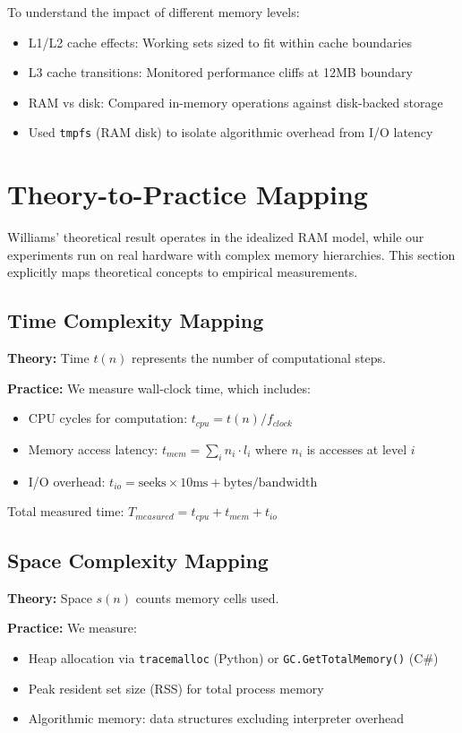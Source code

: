 \documentclass[11pt]{article}
\theoremstyle{definition}
\begin{document}
To understand the impact of different memory levels:
\begin{itemize}
\item L1/L2 cache effects: Working sets sized to fit within cache boundaries
\item L3 cache transitions: Monitored performance cliffs at 12MB boundary
\item RAM vs disk: Compared in-memory operations against disk-backed storage
\item Used \texttt{tmpfs} (RAM disk) to isolate algorithmic overhead from I/O latency
\end{itemize}

\section{Theory-to-Practice Mapping}
\label{sec:theory-practice}

Williams' theoretical result operates in the idealized RAM model, while our experiments run on real hardware with complex memory hierarchies. This section explicitly maps theoretical concepts to empirical measurements.

\subsection{Time Complexity Mapping}

\textbf{Theory:} Time $t(n)$ represents the number of computational steps.

\textbf{Practice:} We measure wall-clock time, which includes:
\begin{itemize}
\item CPU cycles for computation: $t_{cpu} = t(n) / f_{clock}$
\item Memory access latency: $t_{mem} = \sum_{i} n_i \cdot l_i$ where $n_i$ is accesses at level $i$
\item I/O overhead: $t_{io} = \text{seeks} \times 10\text{ms} + \text{bytes} / \text{bandwidth}$
\end{itemize}

Total measured time: $T_{measured} = t_{cpu} + t_{mem} + t_{io}$

\subsection{Space Complexity Mapping}

\textbf{Theory:} Space $s(n)$ counts memory cells used.

\textbf{Practice:} We measure:
\begin{itemize}
\item Heap allocation via \texttt{tracemalloc} (Python) or \texttt{GC.GetTotalMemory()} (C\#)
\item Peak resident set size (RSS) for total process memory
\item Algorithmic memory: data structures excluding interpreter overhead
\end{itemize}
\end{document}
